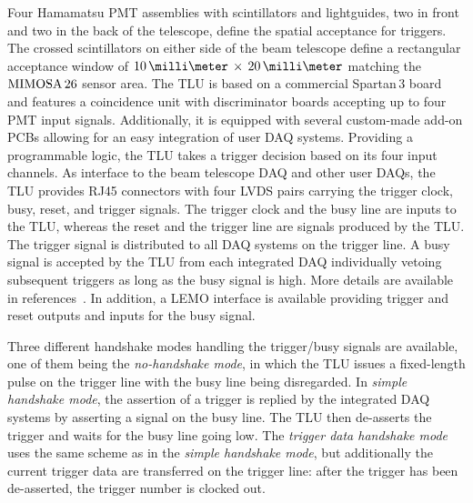 Four Hamamatsu PMT assemblies with scintillators and lightguides, two in front and two in the back of the telescope, define the spatial acceptance for triggers. 
The crossed scintillators on either side of the beam telescope define a rectangular acceptance window of $10\,\milli\meter\,\times\,20\,\milli\meter$ matching the $\textrm{MIMOSA\,26}$ sensor area. 
The TLU is based on a commercial Spartan\,3 board and features a coincidence unit with discriminator boards accepting up to four PMT input signals. 
Additionally, it is equipped with several custom-made add-on PCBs allowing for an easy integration of user DAQ systems. 
Providing a programmable logic, the TLU  takes a trigger decision based on its four input channels. 
As interface to the beam telescope DAQ and other user DAQs, the TLU provides RJ45 connectors with four LVDS pairs carrying the trigger clock, busy, reset, and trigger signals. 
The trigger clock and the busy line are inputs to the TLU, whereas the reset and the trigger line are signals produced by the TLU. 
The trigger signal is distributed to all DAQ systems on the trigger line. 
A busy signal is accepted by the TLU from each integrated DAQ individually vetoing subsequent triggers as long as the busy signal is high. 
More details are available in references~\cite{EUDET-2009-04,ref:TLUproc}.
In addition, a LEMO interface is available providing trigger and reset outputs and inputs for the busy signal.

Three different handshake modes handling the trigger/busy signals are available, one of them being the \textit{no-handshake mode},
 in which the TLU issues a fixed-length pulse on the trigger line with the busy line being disregarded. 
In \textit{simple handshake mode}, the assertion of a trigger is replied by the integrated DAQ systems by asserting a signal on the busy line. 
The TLU then de-asserts the trigger and waits for the busy line going low.
The \textit{trigger data handshake mode} uses the same scheme as in the \textit{simple handshake mode}, but additionally the current trigger data are transferred on the trigger line:
after the trigger has been de-asserted, the trigger number is clocked out. 
%

